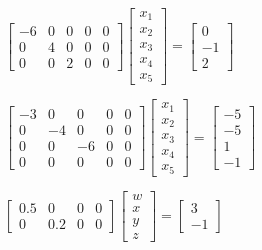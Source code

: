 \begin{exercise}
\begin{Parts}
\begin{OmitV1}
\item \(\begin{bmatrix} -6&0&0&0&0
\\0&4&0&0&0
\\0&0&2&0&0 \end{bmatrix}
\begin{bmatrix}x_1\\x_2\\x_3\\x_4\\x_5\end{bmatrix}
=\begin{bmatrix} 0
\\-1
\\2 \end{bmatrix}\)

\item \(\begin{bmatrix} -3&0&0&0&0
\\0&-4&0&0&0
\\0&0&-6&0&0
\\0&0&0&0&0 \end{bmatrix}
\begin{bmatrix}x_1\\x_2\\x_3\\x_4\\x_5\end{bmatrix}
=\begin{bmatrix} -5
\\-5
\\1
\\-1 \end{bmatrix}\)

\item \(\begin{bmatrix} 0.5&0&0&0
\\0&0.2&0&0 \end{bmatrix}
\begin{bmatrix}w\\x\\y\\z\end{bmatrix}
=\begin{bmatrix} 3
\\-1 \end{bmatrix}\)
\end{OmitV1}


\end{Parts}
\end{exercise}
